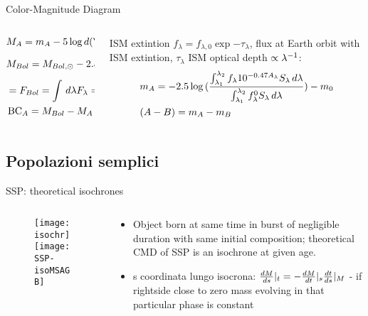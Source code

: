\begin{frame}{Color-Magnitude Diagram}
\begin{columns}[T]
\begin{column}{0.5\textwidth}
\begin{align*}
&M_A=m_A-5\log{d(\si{\parsec})}+5\\
&M_{Bol}=M_{Bol,\odot}-2.5\log{\frac{4\pi R^2F_{Bol}}{\lsun{}}}\\
&=F_{Bol}=\int\,d\lambda F_{\lambda}=\frac{ac}{4}T_e^4\\
&\BC_A=M_{Bol}-M_A
\end{align*}
\end{column}
\begin{column}{0.5\textwidth}
ISM extintion $f_{\lambda}=f_ {\lambda,0}\exp{-\tau_{\lambda}}$, flux at Earth orbit with ISM extintion, $\tau_{\lambda}$ ISM optical depth $\propto\invers{\lambda}$:
\begin{align*}
&m_A=-2.5\log{(\frac{\int_{\lambda_1}^{\lambda_2}f_{\lambda}10\expy{-0.47A_{\lambda}}S_{\lambda}\,d\lambda}{\int_{\lambda_1}^{\lambda_2}f_{\lambda}^0S_{\lambda}\,d\lambda})}-m_0\\
&(A-B)=m_A-m_B
\end{align*}
\end{column}
\end{columns}
\end{frame}

\subsection{Popolazioni semplici}

\begin{frame}{SSP: theoretical isochrones}
\begin{columns}[T]
\begin{column}{0.4\textwidth}
\begin{figure}[!ht]
\texttt{[image: isochr]}
\texttt{[image: SSP-isoMSAGB]}
\end{figure}
\end{column}
\begin{column}{0.6\textwidth}
\begin{itemize}
\item Object born at same time in burst of negligible duration with same initial composition; theoretical CMD of SSP is an isochrone at given age.
\item s coordinata lungo isocrona: $\TDy{s}{M}|_t=-\TDy{t}{M}|_s\TDy{s}{t}|_M$ - if rightside close to zero mass evolving in that particular phase is constant
\end{itemize}
\end{column}
\end{columns}
\end{frame}

